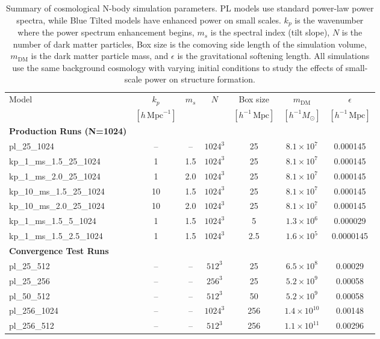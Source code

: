 \documentclass[
 reprint,
 superscriptaddress,
 nofootinbib,
 nobibnotes,
 amsmath,
 amssymb,
 aps,
 prd,
 floatfix,
 longbibliography
]{revtex4-1}
\renewcommand{\arraystretch}{1.5}
\begin{document}
\begin{table}[t]
\centering
\small
\setlength{\tabcolsep}{4pt}
\renewcommand{\arraystretch}{1.25}
\begin{tabular}{l c c c c c c}
\hline
\hline
Model & $k_p$ & $m_s$ & $N$ & Box size & $m_{\text{DM}}$ & $\epsilon$ \\
 & $[h\,\text{Mpc}^{-1}]$ & & & $[h^{-1}\,\text{Mpc}]$ & $[h^{-1}M_\odot]$ & $[h^{-1}\,\text{Mpc}]$ \\
\hline
\textbf{Production Runs (N=1024)} \\
\hline
pl\_25\_1024   & -- & -- & $1024^3$ & 25 & $8.1\times 10^7$ & 0.000145 \\
kp\_1\_ms\_1.5\_25\_1024  & 1  & 1.5 & $1024^3$ & 25 & $8.1\times 10^7$ & 0.000145 \\
kp\_1\_ms\_2.0\_25\_1024  & 1  & 2.0 & $1024^3$ & 25 & $8.1\times 10^7$ & 0.000145 \\
kp\_10\_ms\_1.5\_25\_1024 & 10 & 1.5 & $1024^3$ & 25 & $8.1\times 10^7$ & 0.000145 \\
kp\_10\_ms\_2.0\_25\_1024 & 10 & 2.0 & $1024^3$ & 25 & $8.1\times 10^7$ & 0.000145 \\
kp\_1\_ms\_1.5\_5\_1024   & 1  & 1.5 & $1024^3$ & 5 & $1.3\times 10^6$ & 0.000029 \\
kp\_1\_ms\_1.5\_2.5\_1024 & 1  & 1.5 & $1024^3$ & 2.5 & $1.6\times 10^5$ & 0.0000145 \\
\hline
\textbf{Convergence Test Runs} \\
\hline
pl\_25\_512    & -- & -- & $512^3$  & 25 & $6.5\times 10^8$ & 0.00029 \\
pl\_25\_256    & -- & -- & $256^3$  & 25 & $5.2\times 10^9$ & 0.00058 \\
pl\_50\_512    & -- & -- & $512^3$  & 50 & $5.2\times 10^9$ & 0.00058 \\
pl\_256\_1024  & -- & -- & $1024^3$ & 256 & $1.4\times 10^{10}$ & 0.00148 \\
pl\_256\_512   & -- & -- & $512^3$  & 256 & $1.1\times 10^{11}$ & 0.00296 \\
\hline
\end{tabular}
\caption{Summary of cosmological N-body simulation parameters. PL models use standard power-law power spectra, while Blue Tilted models have enhanced power on small scales. $k_p$ is the wavenumber where the power spectrum enhancement begins, $m_s$ is the spectral index (tilt slope), $N$ is the number of dark matter particles, Box size is the comoving side length of the simulation volume, $m_{\text{DM}}$ is the dark matter particle mass, and $\epsilon$ is the gravitational softening length. All simulations use the same background cosmology with varying initial conditions to study the effects of small-scale power on structure formation.}
\label{tab:simulation_parameters}
\end{table}
\end{document}
